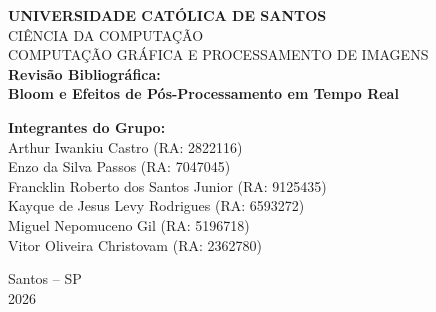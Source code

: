 \documentclass[12pt,a4paper]{article}
\begin{document}
\begin{titlepage}
    \centering
    \vspace*{1cm}
    {\Large \textbf{UNIVERSIDADE CATÓLICA DE SANTOS}}\\[0.3cm]
    {\large CIÊNCIA DA COMPUTAÇÃO}\\[0.3cm]
    {\large COMPUTAÇÃO GRÁFICA E PROCESSAMENTO DE IMAGENS}\\[3.5cm]
    
    {\Huge \textbf{Revisão Bibliográfica:}}\\[0.4cm]
    {\LARGE \textbf{Bloom e Efeitos de Pós-Processamento em Tempo Real}}\\[3cm]
    
    \begin{flushleft}
        \textbf{Integrantes do Grupo:}\\
        Arthur Iwankiu Castro (RA: 2822116)\\
        Enzo da Silva Passos (RA: 7047045)\\
        Francklin Roberto dos Santos Junior (RA: 9125435)\\
        Kayque de Jesus Levy Rodrigues (RA: 6593272)\\
        Miguel Nepomuceno Gil (RA: 5196718)\\
        Vitor Oliveira Christovam (RA: 2362780)\\
    \end{flushleft}
    
    \vfill
    {\large Santos -- SP}\\
    {\large 2026}
\end{titlepage}
\end{document}

